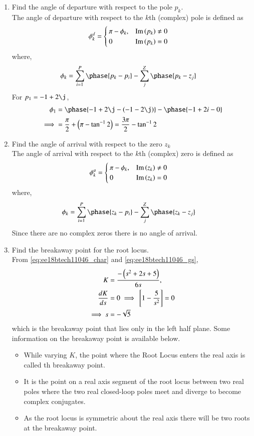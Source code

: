 \begin{enumerate}[label=\thesubsection.\arabic*.,ref=\thesubsection.\theenumi]
\item Find the angle of departure with respect to the  pole $p_k$.
\\
\solution The angle of departure with respect to the $k$th (complex) pole is defined as 
\begin{align}
\phi_{k}^{d}&=
\begin{cases}
\pi-\phi_k, &  \text{Im}\left(p_k\right) \ne 0
\\
0 & \text{Im}\left(p_k\right) = 0
\end{cases}
\end{align}
where,
\begin{align}
\phi_k&=\sum_{i=1}^{P} \phase{p_k-p_i}-\sum_{j}^{Z} \phase{p_k - z_{j}}
\end{align}
%
For $p_1 = -1+2\j$, 
\begin{align}
\phi_{1} &= \phase{-1+2\j-\brak{-1-2\j}} - \phase{-1+2i-0}
\\
\implies  &= \frac{\pi}{2} + \brak{\pi - \tan^{-1}2} = \frac{3\pi}{2} - \tan^{-1}2
\end{align}
%
\item Find the angle of arrival with respect to the zero $z_k$
\\
\solution The angle of arrival with respect to the $k$th (complex) zero is defined as 
\begin{align}
\phi_{k}^{a}&=
\begin{cases}
\pi-\phi_k, &  \text{Im}\left(z_k\right) \ne 0
\\
0 & \text{Im}\left(z_k\right) = 0
\end{cases}
\end{align}
where,
\begin{align}
\phi_k&=\sum_{i=1}^{P} \phase{z_k-p_i}-\sum_{j}^{Z} \phase{z_k - z_{j}}
\end{align}
%
Since there are no complex zeros there is no angle of arrival.

\item Find the breakaway point for the root locus.
\\
\solution From \eqref{eq:ee18btech11046_char} and 
\eqref{eq:ee18btech11046_gs},
    \begin{align}
        K&=\frac{-\left(s^{2}+2 s+5\right)}{6 s},
\\
        \frac{d K}{d s}&=0 \implies {}\left[1-\frac{5}{s^{2}}\right]=0 
\\
  \implies        s&=-\sqrt{5}
    \end{align}
%
which is the  breakaway point that lies only in the left half plane. Some information on the breakaway point is available below.
\begin{itemize}
\item While varying $K$, the point where the Root Locus enters the real axis is called th breakaway point.
\item   It is the point on a real axis segment of the root locus between two real poles where the two real closed-loop poles meet and diverge to become complex conjugates.
\item  As the root locus is symmetric about the real axis there will be two roots at the breakaway point. 


\end{itemize}
\end{enumerate}

